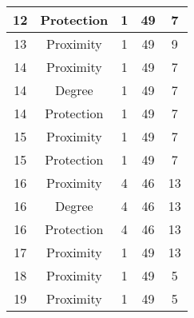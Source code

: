 \documentclass[results.tex]{subfiles}
\begin{document}
\begin{center}
\begin{tabular}{| c || c | c | c | c |}
            \hline
            12                      & Protection                   & 1                      & 49                      & 7                    \\
            \hline
            13                      & Proximity                    & 1                      & 49                      & 9                    \\
            \hline
            14                      & Proximity                    & 1                      & 49                      & 7                    \\
            \hline
            14                      & Degree                       & 1                      & 49                      & 7                    \\
            \hline
            14                      & Protection                   & 1                      & 49                      & 7                    \\
            \hline
            15                      & Proximity                    & 1                      & 49                      & 7                    \\
            \hline
            15                      & Protection                   & 1                      & 49                      & 7                    \\
            \hline
            16                      & Proximity                    & 4                      & 46                      & 13                   \\
            \hline
            16                      & Degree                       & 4                      & 46                      & 13                   \\
            \hline
            16                      & Protection                   & 4                      & 46                      & 13                   \\
            \hline
            17                      & Proximity                    & 1                      & 49                      & 13                   \\
            \hline
            18                      & Proximity                    & 1                      & 49                      & 5                    \\
            \hline
            19                      & Proximity                    & 1                      & 49                      & 5                    \\

\end{tabular}
\end{center}
\end{document}
